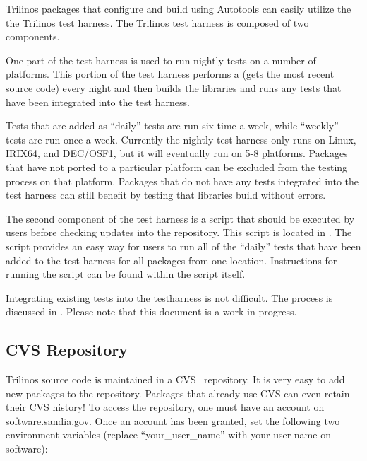 \documentclass[12pt,strict]{TrilinosDevGuide}
\begin{document}
Trilinos packages that configure and build using Autotools can easily 
utilize the the Trilinos test harness.  The Trilinos test harness is composed 
of two components.  

One part of the test harness is used to run nightly tests on a number of 
platforms.  This portion of the test harness performs a 
 (gets the most recent source code) every night and 
then builds the libraries and runs any tests that have been integrated into 
the test harness.  

Tests that are added as ``daily'' tests are run six time a week, while 
``weekly'' tests are run once a week.  Currently the nightly test harness only 
runs on Linux, IRIX64, and DEC/OSF1, but it will eventually run on 5-8 
platforms.  Packages that have not ported to a particular platform can be 
excluded from the testing process on that platform.  Packages that do not have 
any tests integrated into the test harness can still benefit by testing that 
libraries build without errors.  

The second component of the test harness is a script that should be executed 
by users before checking updates into the repository.  This script is located 
in .  The script 
provides an easy way for users to run all of the ``daily'' tests that have 
been added to the test harness for all packages from one location.  
Instructions for running the script can be found within the script itself.

Integrating existing tests into the testharness is not difficult.  
The process is discussed in 
.  
Please note that this document is a work in progress.

\subsection{CVS Repository}

Trilinos source code is maintained in a CVS~\cite{CVS} repository.  It is 
very easy to add new packages to the repository.  Packages that already use 
CVS can even retain their CVS history!  To access the repository, one must 
have an account on software.sandia.gov.  Once an account has been granted, 
set the following two environment variables (replace ``your\_user\_name'' 
with your user name on software):

\end{document}
